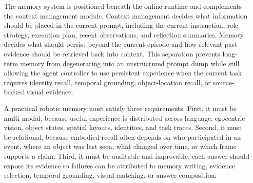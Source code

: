 The memory system is positioned beneath the online runtime and complements the context management module.
Context management decides what information should be placed in the current prompt, including the current instruction, role strategy, execution plan, recent observations, and reflection summaries.
Memory decides what should persist beyond the current episode and how relevant past evidence should be retrieved back into context.
This separation prevents long-term memory from degenerating into an unstructured prompt dump while still allowing the agent controller to use persistent experience when the current task requires identity recall, temporal grounding, object-location recall, or source-backed visual evidence.

A practical robotic memory must satisfy three requirements. First, it
must be multi-modal, because useful experience is distributed across
language, egocentric vision, object states, spatial layouts, identities,
and task traces. Second, it must be relational, because embodied recall
often depends on who participated in an event, where an object was last
seen, what changed over time, or which frame supports a claim. Third, it
must be auditable and improvable: each answer should expose its evidence
so failures can be attributed to memory writing, evidence selection,
temporal grounding, visual matching, or answer composition.





